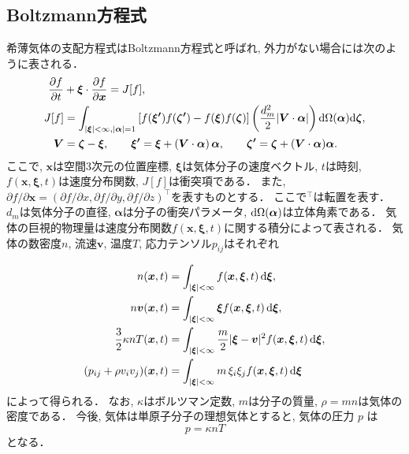 \documentclass[./main]{subfiles}
\begin{document}
\subsection{Boltzmann方程式}
希薄気体の支配方程式はBoltzmann方程式と呼ばれ, 外力がない場合には次のように表される\cite{cercignani1988boltzmann}．
\begin{align}
  \frac{\partial f}{\partial t} &+ \bm{\xi}\cdot\frac{\partial f}{\partial \bm{x}}=J[f], 
    \label{eq:Boltzmann}\\
  J[f] 
    &= \int_{|\bm{\xi}|<\infty,|\bm{\alpha}|=1}
      \left[ f(\bm{\xi^\prime})f(\bm{\zeta^\prime})-f(\bm{\xi})f(\bm{\zeta}) \right] 
      \left( \frac{d_m^2}{2}|\bm{V}\cdot\bm{\alpha}|\right)
      \mathrm{d}\Omega(\bm{\alpha})\mathrm{d}\bm{\zeta}, \notag\\
  \bm{V} &= \bm{\zeta} - \bm{\xi}, \qquad
  \bm{\xi^\prime} = \bm{\xi} + \left(\bm{V}\cdot\bm{\alpha}\right)\bm{\alpha}, \qquad
  \bm{\zeta^\prime} = \bm{\zeta} + (\bm{V}\cdot\bm{\alpha})\bm{\alpha}. \notag
\end{align}
ここで, $\bm{x}$は空間3次元の位置座標, $\bm{\xi}$は気体分子の速度ベクトル, $t$は時刻, $f(\bm{x},\bm{\xi},t)$は速度分布関数, $J[f]$は衝突項である．
また, $\partial f/\partial\bm{x}=(\partial f/\partial x,\partial f/\partial y,\partial f/\partial z)^\top$を表すものとする．
ここで${}^\top$は転置を表す．
$d_m$は気体分子の直径, $\bm{\alpha}$は分子の衝突パラメータ, $\mathrm{d}\Omega(\bm{\alpha})$は立体角素である．
気体の巨視的物理量は速度分布関数$f(\bm{x},\bm{\xi},t)$に関する積分によって表される．
気体の数密度$n$, 流速$\bm{v}$, 温度$T$, 応力テンソル$p_{ij}$はそれぞれ
\begin{subeq}
\begin{align}
  n(\bm{x},t) &= 
    \int_{|\bm{\xi}|<\infty}
    f(\bm{x},\bm{\xi},t) \,\mathrm{d}\bm{\xi}, \label{eq:n}\\
  n\bm{v}(\bm{x},t) &= 
    \int_{|\bm{\xi}|<\infty}
    \bm{\xi}f(\bm{x},\bm{\xi},t) \,\mathrm{d}\bm{\xi}, \label{eq:v}\\
  \frac{3}{2} \kappa n T(\bm{x},t) &= 
    \int_{|\bm{\xi}|<\infty}
    \frac{m}{2}|\bm{\xi}-\bm{v}|^2f(\bm{x},\bm{\xi},t) \,\mathrm{d}\bm{\xi}, 
    \label{eq:T}\\
  (p_{ij}+\rho v_iv_j)(\bm{x},t) &= 
    \int_{|\bm{\xi}|<\infty}
    m\,\xi_i\xi_jf(\bm{x},\bm{\xi},t)\,\mathrm{d}\bm{\xi} \label{eq:pij}
\end{align}
によって得られる．
なお, $\kappa$はボルツマン定数, $m$は分子の質量, $\rho=mn$は気体の密度である．
今後, 気体は単原子分子の理想気体とすると, 気体の圧力 $p$ は
\begin{equation}
  p = \kappa nT \label{eq:p}
\end{equation}
となる．
\end{subeq}
\end{document}
